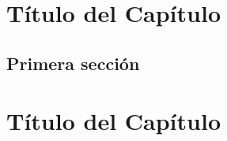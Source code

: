 \documentclass[12pt,a4paper,oneside,]{article}
\def\ifdoblecara{} %
\let\ifdoblecara\undefined %
\def\ifprincipal{} %
\numberwithin{dummy}{section}
\theoremstyle{ocrenumbox}
\theoremstyle{blacknumex}
\theoremstyle{blacknumbox}
\theoremstyle{ocrenum}
\theoremstyle{ocrenum}
\begin{document}
\renewcommand{\headrulewidth}{0.4pt}
\renewcommand{\footrulewidth}{0.4pt}

\ifdefined\ifprincipal
\else
\setlength{\parindent}{1em}
\pagestyle{fancy}
\setcounter{tocdepth}{4}
\tableofcontents

\nocite{Luque2017,Luque2019,RStudio,R-base2,
R-knitr,R-rmarkdown,R-dplyr,R-ggplot2,Techopedia}

\fi

\ifdefined\ifdoblecara
\fancyhead{}{}
\fancyhead[LE,RO]{\scriptsize\rightmark}
\fancyfoot[LO,RE]{\scriptsize\slshape \leftmark}
\fancyfoot[C]{}
\fancyfoot[LE,RO]{\footnotesize\thepage}
\else
\fancyhead{}{}
\fancyhead[RO]{\scriptsize\rightmark}
\fancyfoot[LO]{\scriptsize\slshape \leftmark}
\fancyfoot[C]{}
\fancyfoot[RO]{\footnotesize\thepage}
\fi

\renewcommand{\headrulewidth}{0.4pt}
\renewcommand{\footrulewidth}{0.4pt}

\hypertarget{tuxedtulo-del-capuxedtulo}{%
\section{Título del Capítulo}\label{tuxedtulo-del-capuxedtulo}}

\hypertarget{primera-secciuxf3n}{%
\subsection{Primera sección}\label{primera-secciuxf3n}}

\FloatBarrier

\ifdefined\ifprincipal
\else
\setlength{\parindent}{1em}
\pagestyle{fancy}
\setcounter{tocdepth}{4}
\tableofcontents

\nocite{Luque2017,Luque2019,RStudio,R-base2,
R-knitr,R-rmarkdown,R-dplyr,R-ggplot2,Techopedia}

\fi

\ifdefined\ifdoblecara
\fancyhead{}{}
\fancyhead[LE,RO]{\scriptsize\rightmark}
\fancyfoot[LO,RE]{\scriptsize\slshape \leftmark}
\fancyfoot[C]{}
\fancyfoot[LE,RO]{\footnotesize\thepage}
\else
\fancyhead{}{}
\fancyhead[RO]{\scriptsize\rightmark}
\fancyfoot[LO]{\scriptsize\slshape \leftmark}
\fancyfoot[C]{}
\fancyfoot[RO]{\footnotesize\thepage}
\fi

\renewcommand{\headrulewidth}{0.4pt}
\renewcommand{\footrulewidth}{0.4pt}

\hypertarget{tuxedtulo-del-capuxedtulo-1}{%
\section{Título del Capítulo}\label{tuxedtulo-del-capuxedtulo-1}}
\end{document}
